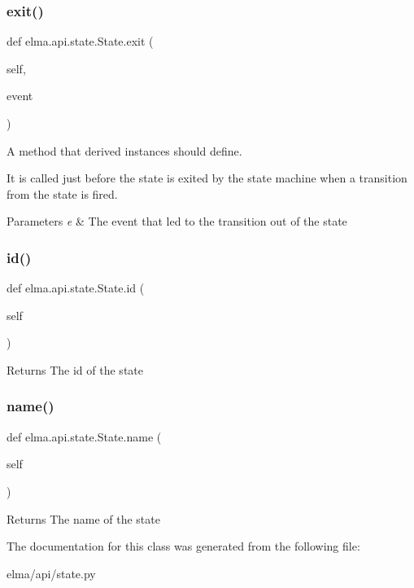 \subsubsection{\texorpdfstring{exit()}{exit()}}
{\footnotesize\ttfamily def elma.\+api.\+state.\+State.\+exit (\begin{DoxyParamCaption}\item[{}]{self,  }\item[{}]{event }\end{DoxyParamCaption})}



A method that derived instances should define. 

It is called just before the state is exited by the state machine when a transition from the state is fired. 
\begin{DoxyParams}{Parameters}
{\em e} & The event that led to the transition out of the state \\
\hline
\end{DoxyParams}
\mbox{\label{classelma_1_1api_1_1state_1_1State_aad456a6f35fb49f1e1702eac0954ed2c}} 
\subsubsection{\texorpdfstring{id()}{id()}}
{\footnotesize\ttfamily def elma.\+api.\+state.\+State.\+id (\begin{DoxyParamCaption}\item[{}]{self }\end{DoxyParamCaption})}

\begin{DoxyReturn}{Returns}
The id of the state 
\end{DoxyReturn}
\mbox{\label{classelma_1_1api_1_1state_1_1State_af557d974acb64b3cd0b6bc687bb1658a}} 
\subsubsection{\texorpdfstring{name()}{name()}}
{\footnotesize\ttfamily def elma.\+api.\+state.\+State.\+name (\begin{DoxyParamCaption}\item[{}]{self }\end{DoxyParamCaption})}

\begin{DoxyReturn}{Returns}
The name of the state 
\end{DoxyReturn}


The documentation for this class was generated from the following file\+:\begin{DoxyCompactItemize}
\item 
elma/api/state.\+py\end{DoxyCompactItemize}
